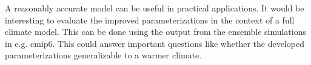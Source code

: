 A reasonably accurate model can be useful in practical applications. It would be interesting to evaluate the improved parameterizations in the context of a full climate model. This can be done using the output from the ensemble simulations in e.g. \acrshort{cmip6}. This could answer important questions like whether the developed parameterizations generalizable to a warmer climate.


